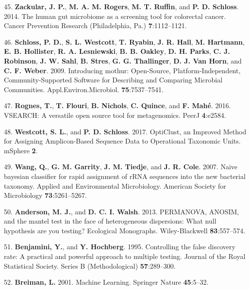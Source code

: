 \documentclass[12pt,]{article}
\begin{document}
\hypertarget{ref-zackular_human_2014}{}
45. \textbf{Zackular, J. P.}, \textbf{M. A. M. Rogers}, \textbf{M. T.
Ruffin}, and \textbf{P. D. Schloss}. 2014. The human gut microbiome as a
screening tool for colorectal cancer. Cancer Prevention Research
(Philadelphia, Pa.) \textbf{7}:1112--1121.

\hypertarget{ref-schloss_introducing_2009}{}
46. \textbf{Schloss, P. D.}, \textbf{S. L. Westcott}, \textbf{T.
Ryabin}, \textbf{J. R. Hall}, \textbf{M. Hartmann}, \textbf{E. B.
Hollister}, \textbf{R. A. Lesniewski}, \textbf{B. B. Oakley}, \textbf{D.
H. Parks}, \textbf{C. J. Robinson}, \textbf{J. W. Sahl}, \textbf{B.
Stres}, \textbf{G. G. Thallinger}, \textbf{D. J. Van Horn}, and
\textbf{C. F. Weber}. 2009. Introducing mothur: Open-Source,
Platform-Independent, Community-Supported Software for Describing and
Comparing Microbial Communities. Appl.Environ.Microbiol.
\textbf{75}:7537--7541.

\hypertarget{ref-rognes_vsearch_2016}{}
47. \textbf{Rognes, T.}, \textbf{T. Flouri}, \textbf{B. Nichols},
\textbf{C. Quince}, and \textbf{F. Mahé}. 2016. VSEARCH: A versatile
open source tool for metagenomics. PeerJ \textbf{4}:e2584.

\hypertarget{ref-westcott_opticlust_2017}{}
48. \textbf{Westcott, S. L.}, and \textbf{P. D. Schloss}. 2017.
OptiClust, an Improved Method for Assigning Amplicon-Based Sequence Data
to Operational Taxonomic Units. mSphere \textbf{2}.

\hypertarget{ref-rdp_Wang2007}{}
49. \textbf{Wang, Q.}, \textbf{G. M. Garrity}, \textbf{J. M. Tiedje},
and \textbf{J. R. Cole}. 2007. Naive bayesian classifier for rapid
assignment of rRNA sequences into the new bacterial taxonomy. Applied
and Environmental Microbiology. American Society for Microbiology
\textbf{73}:5261--5267.

\hypertarget{ref-permanova_Anderson2013}{}
50. \textbf{Anderson, M. J.}, and \textbf{D. C. I. Walsh}. 2013.
PERMANOVA, ANOSIM, and the mantel test in the face of heterogeneous
dispersions: What null hypothesis are you testing? Ecological
Monographs. Wiley-Blackwell \textbf{83}:557--574.

\hypertarget{ref-benjamini_controlling_1995}{}
51. \textbf{Benjamini, Y.}, and \textbf{Y. Hochberg}. 1995. Controlling
the false discovery rate: A practical and powerful approach to multiple
testing. Journal of the Royal Statistical Society. Series B
(Methodological) \textbf{57}:289--300.

\hypertarget{ref-Breiman2001}{}
52. \textbf{Breiman, L.} 2001. Machine Learning. Springer Nature
\textbf{45}:5--32.
\end{document}
